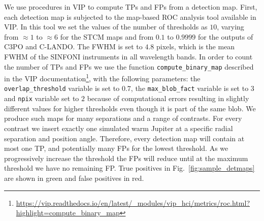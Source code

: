 \documentclass{aa}
\begin{document}
We use procedures in VIP \citep{2017AJGomezVIP,2023Christiaens} to compute TPs and FPs from a detection map. First, each detection map is subjected to the map-based ROC analysis tool available in VIP. In this tool we set the values of the number of thresholds as $10$, varying from $\approx 1$ to $\approx 6$ for the STCM maps and from $0.1$ to $0.9999$ for the outputs of C3PO and C-LANDO. The FWHM is set to $4.8$ pixels, which is the mean FWHM of the SINFONI instruments in all wavelength bands. 
In order to count the number of TPs and FPs we use the function \texttt{compute\_binary\_map} described in the VIP documentation\footnote{\url{https://vip.readthedocs.io/en/latest/_modules/vip_hci/metrics/roc.html?highlight=compute_binary_map}}, with the following parameters: the \texttt{overlap\_threshold} variable is set to $0.7$, the \texttt{max\_blob\_fact} variable is set to $3$ and \texttt{npix} variable set to $2$ because of computational errors resulting in slightly different values for higher thresholds even though it is part of the same blob.
We produce such maps for many separations and a range of contrasts.
For every contrast we insert exactly one simulated warm Jupiter at a specific radial separation and position angle.
Therefore, every detection map will contain at most one TP, and potentially many FPs for the lowest threshold. 
As we progressively increase the threshold the FPs will reduce until at the maximum threshold we have no remaining FP. 
True positives in Fig.~\ref{fig:sample_detmaps} are shown in green and false positives in red.
\end{document}
